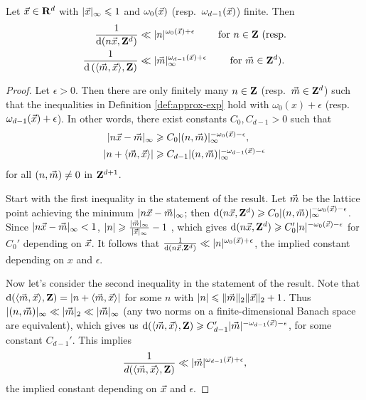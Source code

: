 \begin{lemma}\label{lem:bound-distance}
Let $\vec{x}\in \mathbf{R}^d$ with $|\vec{x}|_\infty\leqslant 1$ and $\omega_0(\vec{x})$ 
(resp.~$\omega_{d-1}(\vec{x})$) finite. Then 
\begin{align*}
	\frac{1}{\mathrm{d}(n \vec{x},\mathbf{Z}^d)} 
		&\ll |n|^{\omega_0(\vec{x})+\epsilon}\qquad \text{ for $n\in \mathbf{Z}$ (resp.} \\
	\frac{1}{\mathrm{d}\left(\langle \vec{m},\vec{x}\rangle, \mathbf{Z}\right)} 
		&\ll |\vec{m}|_\infty^{\omega_{d-1}(\vec{x})+\epsilon} \qquad\text{ for $\vec{m}\in \mathbf{Z}^d$).}
\end{align*}
\end{lemma}
\begin{proof}
Let $\epsilon>0$. Then there are only finitely many $n\in \mathbf{Z}$ 
(resp.~$\vec{m}\in \mathbf{Z}^d$) such that the inequalities in Definition 
\ref{def:approx-exp} hold with $\omega_0(x)+\epsilon$ 
(resp.~$\omega_{d-1}(\vec{x})+\epsilon$). In other words, there exist constants 
$C_0, C_{d-1}>0$ such that 
\begin{align*}
	|n \vec{x} - \vec{m}|_\infty 
		&\geqslant C_0 |(n,\vec{m})|_\infty^{-\omega_0(\vec{x})-\epsilon} ,\\
	|n + \langle \vec{m},\vec{x}\rangle| 
		&\geqslant C_{d-1} |(n,\vec{m})|_\infty^{-\omega_{d-1}(\vec{x})-\epsilon} 
\end{align*}
for all $(n,\vec{m})\ne 0$ in $\mathbf{Z}^{d+1}$. 

Start with the first inequality in the statement of the result. Let 
$\vec{m}$ be the lattice point achieving the minimum $|n \vec{x} - \vec{m}|_\infty$; 
then 
$\mathrm{d}(n \vec{x},\mathbf{Z}^d) \geqslant C_0 |(n,\vec{m})|_\infty^{-\omega_0(\vec{x})-\epsilon}$. 
Since $|n\vec{x} - \vec{m}|_\infty < 1$, 
$|n| \geqslant \frac{|\vec{m}|_\infty}{|\vec{x}|_\infty}-1$ , which gives 
$\mathrm{d}(n \vec{x},\mathbf{Z}^d) \geqslant C_0' |n|^{-\omega_0(\vec{x})-\epsilon}$ for $C_0'$ 
depending on $\vec{x}$. It follows that 
$\frac{1}{\mathrm{d}(n \vec{x},\mathbf{Z}^d)} \ll |n|^{\omega_0(\vec{x})+\epsilon}$, the 
implied constant depending on $x$ and $\epsilon$.

Now let's consider the second inequality in the statement of the result. Note 
that $\mathrm{d}(\langle \vec{m},\vec{x}\rangle,\mathbf{Z}) = |n + \langle \vec{m},\vec{x}\rangle|$ for 
some $n$ with $|n| \leqslant \|\vec{m}\|_2 \|\vec{x}\|_2 + 1$. Thus 
$|(n,\vec{m})|_\infty \ll |\vec{m}|_2 \ll |\vec{m}|_\infty$ (any two norms on a 
finite-dimensional Banach space are equivalent), which gives us 
$\mathrm{d}(\langle\vec{m},\vec{x}\rangle,\mathbf{Z}) \geqslant C_{d-1}' |\vec{m}|^{-\omega_{d-1}(\vec{x})-\epsilon}$, for some constant $C_{d-1}'$. This implies 
\[
	\frac{1}{d(\langle \vec{m},\vec{x}\rangle,\mathbf{Z})} \ll |\vec{m}|^{\omega_{d-1}(\vec{x})+\epsilon} ,
\]
the implied constant depending on $\vec{x}$ and $\epsilon$.
\end{proof}





